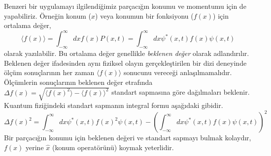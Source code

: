 \documentclass[00_kitap.tex]{subfiles}
\begin{document}
Benzeri bir uygulamayı ilgilendiğimiz parçacığın konumu ve momentumu için de yapabiliriz. Örneğin konum ($x$) veya konumun bir fonksiyonu ($f(x)$) için ortalama değer,
\begin{equation}
\langle f(x) \rangle =\int ^{\infty }_{-\infty }dx f(x) P\left( x,t\right) =\int ^{\infty }_{-\infty }dx \psi^{\ast }\left(x,t\right) f(x) \psi \left( x,t\right)
\label{eq:expactation_value}
\end{equation}
olarak yazılabilir. Bu ortalama değer genellikle \emph{beklenen değer} olarak adlandırılır. Beklenen değer ifadesinden aynı fiziksel olayın gerçekleştirilen bir dizi deneyinde ölçüm sonuçlarının her zaman $\langle f(x) \rangle$ sonucunu vereceği anlaşılmamalıdır. Ölçümlerin sonuçlarının beklenen değer etrafında $\Delta f(x) = \sqrt{\langle f(x)^2 \rangle - \langle f(x) \rangle^2}$ standart sapmasına göre dağılmaları beklenir. Kuantum fiziğindeki standart sapmanın integral formu aşağıdaki gibidir.
\begin{equation}
\Delta f(x)^2 = \int ^{\infty }_{-\infty }dx \psi^{\ast }\left(x,t\right) f(x)^2 \psi \left( x,t\right) -\left( \int ^{\infty }_{-\infty }dx \psi^{\ast }\left(x,t\right) f(x) \psi \left( x,t\right)\right)^2
\end{equation}
Bir parçacığın konumu için beklenen değeri ve standart sapmayı bulmak kolaydır, $f(x)$ yerine $\hat x$ (konum operatörünü) koymak yeterlidir. 
\end{document}

